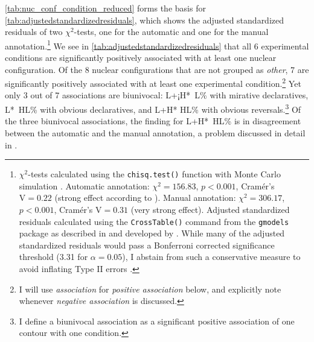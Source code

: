 

\autoref{tab:nuc_conf_condition_reduced} forms the basis for \autoref{tab:adjustedstandardizedresiduals}, which shows the adjusted standardized residuals of two $\chi^2$-tests, one for the automatic and one for the manual annotation.\footnote{$\chi^2$-tests calculated using the \texttt{chisq.test()} function with Monte Carlo simulation \citep{Hope.1968}. Automatic annotation: $\chi^2 = 156.83$, $p < 0.001$, Cramér's $\text{V} = 0.22$ (strong effect according to \cite[222]{Cohen.19882013}). Manual annotation: $\chi^2 = 306.17$, $p < 0.001$, Cramér's $\text{V} = 0.31$ (very strong effect). Adjusted standardized residuals calculated using the \texttt{CrossTable()} command from the \texttt{gmodels} package \citep{WarnesBolkerLumleyJohnson.2018} as described in \citet[812--828]{FieldMilesField.2012} and developed by \citet{Haberman.1973}. While many of the adjusted standardized residuals would pass a Bonferroni corrected significance threshold (3.31 for $\alpha = 0.05$), I abstain from such a conservative measure to avoid inflating Type II errors \citep{Armstrong.2014}.} We see in \autoref{tab:adjustedstandardizedresiduals} that all 6 experimental conditions are significantly positively associated with at least one nuclear configuration. Of the 8 nuclear configurations that are not grouped as \textit{other}, 7 are significantly positively associated with at least one experimental condition.\footnote{I will use \textit{association} for \textit{positive association} below, and explicitly note whenever \textit{negative association} is discussed.} Yet only 3 out of 7 associations are biunivocal: L+¡H*~L\% with mirative declaratives, L*~HL\% with obvious declaratives, and L+H* HL\% with obvious reversals.\footnote{I define a biunivocal association as a significant positive association of one contour with one condition.} Of the three biunivocal associations, the finding for L+H*~HL\% is in disagreement between the automatic and the manual annotation, a problem discussed in detail in .

